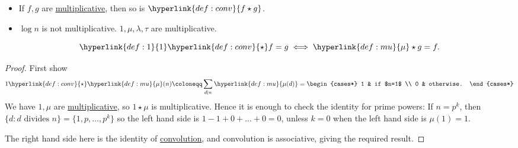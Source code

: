 \documentclass{article}
\newcommand{\1}{\mathbbm{1}}
\newcommand{\named}[1]{\textbf{#1}\index{#1}}
\begin{document}
\begin{fact}\leavevmode
  \begin{itemize}
    \item If $f,g$ are \hyperlink{def:multi}{multiplicative}, then so is $\hyperlink{def:conv}{f\star g}$.
    \item $\log n $ is not multiplicative.
      $1,\mu,\lambda,\tau$ are multiplicative.
  \end{itemize}
\end{fact}
\begin{fact}
  \begin{equation*}
    \hyperlink{def:1}{1} \hyperlink{def:conv}{\star} f = g \iff \hyperlink{def:mu}{\mu} \star g = f.
  \end{equation*}
\end{fact}

\begin{proof}
  First show
  \begin{equation*}
    1 \hyperlink{def:conv}{\star} \hyperlink{def:mu}{\mu}(n) \coloneqq
    \sum_{d \mid n} \hyperlink{def:mu}{\mu(d)} =
    \begin{cases*}
      1 & if $n=1$ \\
      0 & otherwise.
    \end{cases*}
  \end{equation*}
  We have $1,\mu$ are \hyperlink{def:multi}{multiplicative}, so $1\star\mu$ is multiplicative.
  Hence it is enough to check the identity for prime powers:
  If $n= p^k$, then $\{d : d\text{ divides }n\} = \{1,p,\ldots,p^k\}$ so the left hand side is $1-1 + 0 + \ldots + 0 = 0$, unless $k=0$ when the left hand side is $\mu(1) =1$.

  The right hand side here is the identity of \hyperlink{def:conv}{convolution}, and convolution is associative, giving the required result.
\end{proof}
\end{document}

